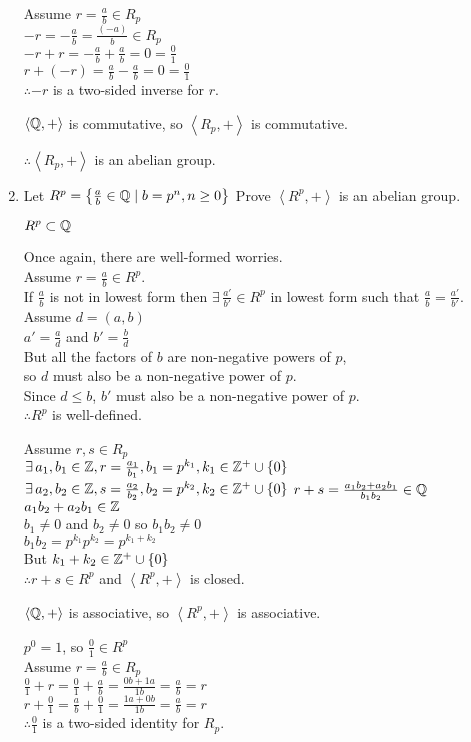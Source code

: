 \documentclass[letterpaper,12pt,fleqn]{article}
\newcommand{\bas}[2]{\left<#1,#2\right>}
\begin{document}
\begin{enumerate}[label=\alph*)]
  Assume $r=\frac{a}{b}\in R_p$ \\
  $-r=-\frac{a}{b}=\frac{(-a)}{b}\in R_p$ \\
  $-r+r=-\frac{a}{b}+\frac{a}{b}=0=\frac{0}{1}$ \\
  $r+(-r)=\frac{a}{b}-\frac{a}{b}=0=\frac{0}{1}$ \\
  $\therefore -r$ is a two-sided inverse for $r$.

  $\bas{\Q}{+}$ is commutative, so $\bas{R_p}{+}$ is commutative.

  $\therefore \bas{R_p}{+}$ is an abelian group.

\item Let $R^p=\left\{\frac{a}{b}\in\mathbb{Q}\mid b=p^n,n\ge0\right\}$
  Prove $\bas{R^p}{+}$ is an abelian group.

  $R^p\subset\mathbb{Q}$

  Once again, there are well-formed worries. \\
  Assume $r=\frac{a}{b}\in R^p$. \\
  If $\frac{a}{b}$ is not in lowest form then $\exists\,\frac{a'}{b'}\in R^p$
  in lowest form such that $\frac{a}{b}=\frac{a'}{b'}$. \\
  Assume $d=(a,b)$ \\
  $a'=\frac{a}{d}$ and $b'=\frac{b}{d}$ \\
  But all the factors of $b$ are non-negative powers of $p$, \\
  so $d$ must also be a non-negative power of $p$. \\
  Since $d\le b$, $b'$ must also be a non-negative power of $p$. \\
  $\therefore R^p$ is well-defined.

  Assume $r,s\in R_p$ \\
  $\exists\,a_1,b_1\in\mathbb{Z},r=\frac{a_1}{b_1},b_1=p^{k_1},k_1\in\mathbb{Z}^+\cup\{0\}$
  $\exists\,a_2,b_2\in\mathbb{Z},s=\frac{a_2}{b_2},b_2=p^{k_2},k_2\in\mathbb{Z}^+\cup\{0\}$
  $r+s=\frac{a_1b_2+a_2b_1}{b_1b_2}\in\mathbb{Q}$ \\
  $a_1b_2+a_2b_1\in\mathbb{Z}$ \\
  $b_1\ne0$ and $b_2\ne0$ so $b_1b_2\ne0$ \\
  $b_1b_2=p^{k_1}p^{k_2}=p^{k_1+k_2}$ \\
  But $k_1+k_2\in\mathbb{Z}^+\cup\{0\}$ \\
  $\therefore r+s\in R^p$ and $\bas{R^p}{+}$ is closed.

  $\bas{\Q}{+}$ is associative, so $\bas{R^p}{+}$ is associative.

  $p^0=1$, so $\frac{0}{1}\in R^p$ \\
  Assume $r=\frac{a}{b}\in R_p$ \\
  $\frac{0}{1}+r=\frac{0}{1}+\frac{a}{b}=\frac{0b+1a}{1b}=\frac{a}{b}=r$ \\
  $r+\frac{0}{1}=\frac{a}{b}+\frac{0}{1}=\frac{1a+0b}{1b}=\frac{a}{b}=r$ \\
  $\therefore \frac{0}{1}$ is a two-sided identity for $R_p$.


\end{enumerate}
\end{document}
